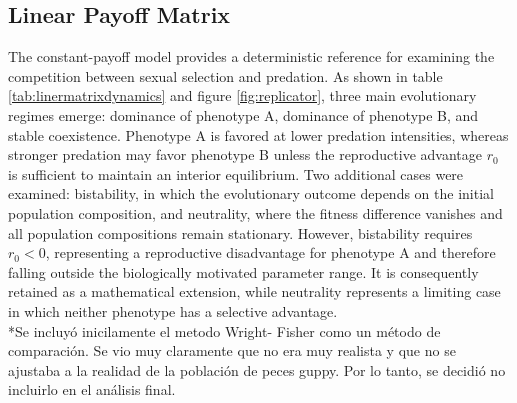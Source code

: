 \subsection{Linear Payoff Matrix }
The constant-payoff model provides a deterministic reference for examining the competition between sexual selection and predation. As shown in table \ref{tab:linermatrixdynamics} and figure \ref{fig:replicator}, three main evolutionary regimes emerge: dominance of phenotype A, dominance of phenotype B, and stable coexistence. Phenotype A is favored at lower predation intensities, whereas stronger predation may favor phenotype B unless the reproductive advantage \(r_0\) is sufficient to maintain an interior equilibrium. Two additional cases were examined: bistability, in which the evolutionary outcome depends on the initial population composition, and neutrality, where the fitness difference vanishes and all population compositions remain stationary. However, bistability requires \(r_0<0\), representing a reproductive disadvantage for phenotype A and therefore falling outside the biologically motivated parameter range. It is consequently retained as a mathematical extension, while neutrality represents a limiting case in which neither phenotype has a selective advantage. \\ 



 *Se incluyó inicilamente el metodo Wright- Fisher como un método de comparación. Se vio muy claramente que no era muy realista y que no se ajustaba a la realidad de la población de peces guppy. Por lo tanto, se decidió no incluirlo en el análisis final.\\
